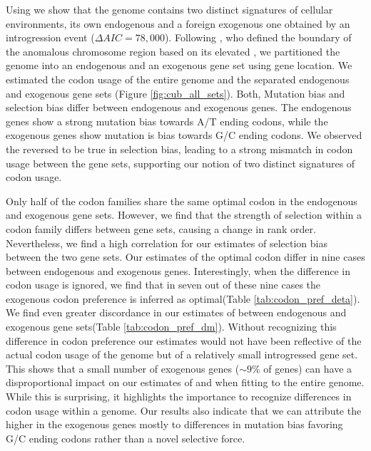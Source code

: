 Using \ROC we show that the \kluyveri genome contains two distinct signatures of cellular environments, its own endogenous and a foreign exogenous one obtained by an introgression event ($\Delta AIC = 78,000$).
Following \citet{payen2009}, who defined the boundary of the anomalous chromosome region based on its elevated \GC, we partitioned the \kluyveri genome into an endogenous and an exogenous gene set using gene location.
We estimated the codon usage of the entire \kluyveri genome and the separated endogenous and exogenous gene sets (Figure \ref{fig:cub_all_sets}).
Both, Mutation bias and selection bias differ between endogenous and exogenous genes.
The endogenous genes show a strong mutation bias towards A/T ending codons, while the exogenous genes show mutation is bias towards G/C ending codons.
We observed the reversed to be true in selection bias, leading to a strong mismatch in codon usage between the gene sets, supporting our notion of two distinct signatures of codon usage.

Only half of the codon families share the same optimal codon in the endogenous and exogenous gene sets.
However, we find that the strength of selection within a codon family differs between gene sets, causing a change in rank order.
Nevertheless, we find a high correlation for our estimates of selection bias \DE between the two gene sets.
Our estimates of the optimal codon differ in nine cases between endogenous and exogenous genes.
Interestingly, when the difference in codon usage is ignored, we find that in seven out of these nine cases the exogenous codon preference is inferred as optimal(Table \ref{tab:codon_pref_deta}).
We find even greater discordance in our estimates of \DM between endogenous and exogenous gene sets(Table \ref{tab:codon_pref_dm}).
Without recognizing this difference in codon preference our estimates would not have been reflective of the actual codon usage of the \kluyveri genome but of a relatively small introgressed gene set.
This shows that a small number of exogenous genes ($\sim 9 \%$ of genes) can have a disproportional impact on our estimates of \DM and \DE when fitting \ROC to the entire \kluyveri genome.
While this is surprising, it highlights the importance to recognize differences in codon usage within a genome.
Our results also indicate that we can attribute the higher \GC in the exogenous genes mostly to differences in mutation bias favoring G/C ending codons rather than a novel selective force.

